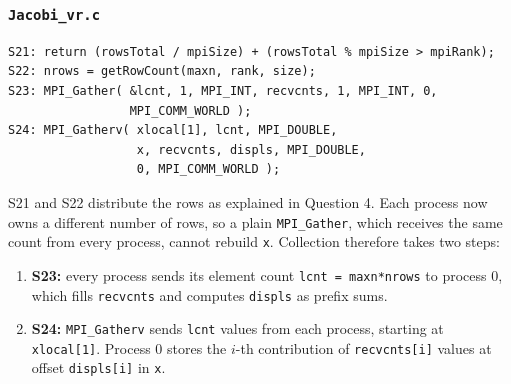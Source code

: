 \documentclass[11pt,a4paper]{article}
\begin{document}
\subsubsection*{\texttt{Jacobi\_vr.c}}
\begin{lstlisting}
S21: return (rowsTotal / mpiSize) + (rowsTotal % mpiSize > mpiRank);
S22: nrows = getRowCount(maxn, rank, size);
S23: MPI_Gather( &lcnt, 1, MPI_INT, recvcnts, 1, MPI_INT, 0,
                 MPI_COMM_WORLD );
S24: MPI_Gatherv( xlocal[1], lcnt, MPI_DOUBLE,
                  x, recvcnts, displs, MPI_DOUBLE,
                  0, MPI_COMM_WORLD );
\end{lstlisting}
S21 and S22 distribute the rows as explained in Question 4. Each process now owns a different number of rows, so a plain \texttt{MPI\_Gather}, which receives the same count from every process, cannot rebuild \texttt{x}. Collection therefore takes two steps:
\begin{enumerate}
  \item \textbf{S23:} every process sends its element count \texttt{lcnt = maxn*nrows} to process 0, which fills \texttt{recvcnts} and computes \texttt{displs} as prefix sums.
  \item \textbf{S24:} \texttt{MPI\_Gatherv} sends \texttt{lcnt} values from each process, starting at \texttt{xlocal[1]}. Process 0 stores the $i$-th contribution of \texttt{recvcnts[i]} values at offset \texttt{displs[i]} in \texttt{x}.
\end{enumerate}
\end{document}
